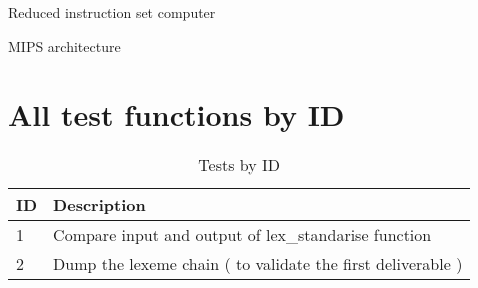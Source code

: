 \documentclass[twoside,twocolumn]{article}
\begin{document}
\begin{thebibliography}{99} %


\newblock Reduced instruction set computer

\newblock MIPS architecture

\newblock 

\end{thebibliography}


\appendix
\section{All test functions by ID}

\begin{table}[!h]
\caption{Tests by ID}
\centering
\begin{tabular}{|p{2cm}|p{2cm}|}
\hline
ID & Description \\
\hline
1 & Compare input and output of lex\_standarise function \\
\hline
2 & Dump the lexeme chain ( to validate the first deliverable ) \\
\hline
\end{tabular}
\end{table}


% 
\end{document}
